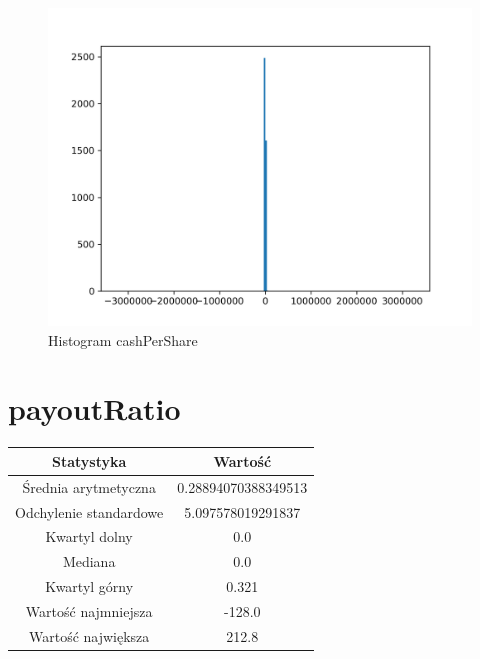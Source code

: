 \documentclass{article}
\begin{document}
\begin{figure}[h!]
    \includegraphics[width=\linewidth]{variables/cashPerShare.png}
    \caption{Histogram cashPerShare }
\end{figure}\section{ payoutRatio }

\begin{center}
    \begin{tabular}{|c | c|} 
    \hline
    Statystyka & Wartość \\
    \hline\hline
    Średnia arytmetyczna & 0.28894070388349513 \\ 
    \hline
    Odchylenie standardowe & 5.097578019291837 \\
    \hline
    Kwartyl dolny & 0.0 \\
    \hline
    Mediana & 0.0 \\
    \hline
    Kwartyl górny & 0.321 \\
    \hline
    Wartość najmniejsza & -128.0 \\
    \hline
    Wartość największa & 212.8 \\
    \hline
   \end{tabular}
\end{center}
\end{document}
